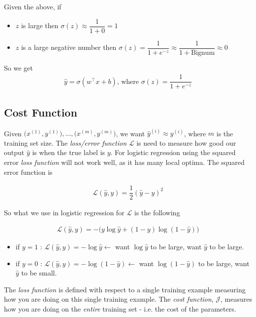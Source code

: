 \documentclass[12pt,reqno]{book}      %
\begin{document}
Given the above, if
\begin{itemize}
	\item $z$ is large then $\sigma(z) \approx \dfrac{1}{1 + 0} = 1$
    \item $z$ is a large negative number then $\sigma(z) = \dfrac{1}{1 + e^{-z}} \approx \dfrac{1}{1 + \text{Bignum}} \approx 0$
\end{itemize}

So we get
\begin{align}
\hat{y} = \sigma(w^\intercal x + b) \text{, where } \sigma(z) = \dfrac{1}{1 + e^{-z}}
\end{align}


\subsection{Cost Function}
Given $\big( x^{(1)}, y^{(1)} \big),\dots{} , \big( x^{(m)}, y^{(m)} \big)$, we want $\hat{y}^{(i)} \approx y^{(i)}$, where $m$ is the training set size. The \textit{loss/error function} $\mathscr{L}$ is need to measure how good our output $\hat{y}$ is when the true label is $y$.  For logistic regression using the squared error  \textit{loss function} will not work well, as it has many local optima. The squared error function is 

\begin{align}
\mathscr{L}(\hat{y}, y) = \dfrac{1}{2} (\hat{y} - y)^{2}
\end{align}

So what we use in logistic regression for $\mathscr{L}$ is the following

\begin{align}
\mathscr{L}(\hat{y}, y) = - \big( y \log \hat{y} + (1 - y) \log  (1 - \hat{y}) \big)
\end{align}

\begin{itemize}
	\item if $y = 1$ : $\mathscr{L}(\hat{y}, y) = - \log \hat{y} \leftarrow$ want $\log \hat{y}$ to be large, want $\hat{y}$ to be large.
	\item if $ y= 0$ : $\mathscr{L}(\hat{y}, y) = - \log (1 - \hat{y}) \leftarrow$ want $\log (1 - \hat{y})$ to be large, want $\hat{y}$ to be small.
\end{itemize}

The \textit{loss function} is defined with respect to a single training example measuring how you are doing on this single training example. The \textit{cost function}, $\mathscr{J}$, measures how you are doing on the \textit{entire} training set - i.e. the cost of the parameters. 
\end{document}
